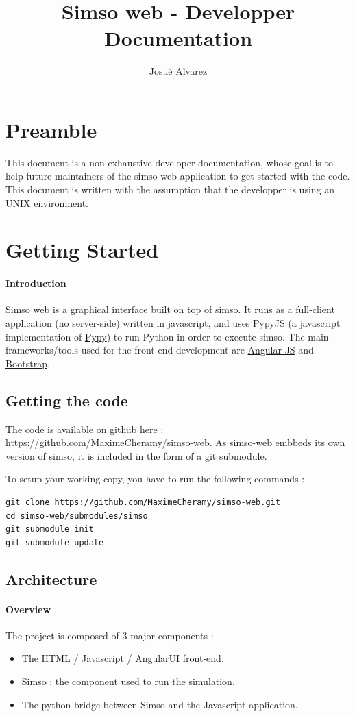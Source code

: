 \documentclass[10pt,a4paper]{article}
\author{Josué Alvarez}
\title{Simso web - Developper Documentation}
\begin{document}
\maketitle
\newpage
\section{Preamble}
This document is a non-exhaustive developer documentation, whose goal is to help future maintainers of the simso-web application to get started with the code. 
This document is written with the assumption that the developper is using an UNIX environment.

\section{Getting Started}
\paragraph{Introduction}
Simso web is a graphical interface built on top of simso. It runs as a full-client application (no server-side) written in javascript, and uses PypyJS (a javascript implementation of \href{"http://www.pypy.org/"}{Pypy}) to run Python in order to execute simso.
The main frameworks/tools used for the front-end development are \href{"https://angularjs.org/"}{Angular JS} and \href{"http://getbootstrap.com/"}{Bootstrap}.

\subsection{Getting the code}
The code is available on github here : https://github.com/MaximeCheramy/simso-web. 
As simso-web embbeds its own version of simso, it is included in the form of a git submodule.

To setup your working copy, you have to run the following commands :
\begin{lstlisting}
git clone https://github.com/MaximeCheramy/simso-web.git
cd simso-web/submodules/simso
git submodule init
git submodule update
\end{lstlisting}

\subsection{Architecture}
\paragraph{Overview}
The project is composed of 3 major components :
\begin{itemize}
\item The HTML / Javascript / AngularUI front-end.
\item Simso : the component used to run the simulation.
\item The python bridge between Simso and the Javascript application.
\end{itemize}
\end{document}
